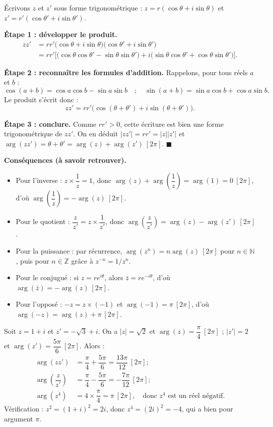 \documentclass[11pt]{article}
\begin{document}
\begin{experience}
Écrivons $z$ et $z'$ sous forme trigonométrique : $z = r(\cos\theta + i\sin\theta)$ et $z' = r'(\cos\theta' + i\sin\theta')$.

\textbf{Étape 1 : développer le produit.}
\begin{align*}
zz' &= rr'\big(\cos\theta + i\sin\theta\big)\big(\cos\theta' + i\sin\theta'\big) \\
&= rr'\Big[\big(\cos\theta\cos\theta' - \sin\theta\sin\theta'\big) + i\big(\sin\theta\cos\theta' + \cos\theta\sin\theta'\big)\Big].
\end{align*}

\textbf{Étape 2 : reconnaître les formules d'addition.} Rappelons, pour tous réels $a$ et $b$ :
\[ \cos(a+b) = \cos a\cos b - \sin a\sin b \quad ; \quad \sin(a+b) = \sin a\cos b + \cos a\sin b. \]
Le produit s'écrit donc :
\[ zz' = rr'\big(\cos(\theta+\theta') + i\sin(\theta+\theta')\big). \]

\textbf{Étape 3 : conclure.} Comme $rr' > 0$, cette écriture est bien une forme trigonométrique de $zz'$. On en déduit $|zz'| = rr' = |z||z'|$ et $\arg(zz') = \theta + \theta' = \arg(z) + \arg(z') \ [2\pi]$. $\blacksquare$

\textbf{Conséquences (à savoir retrouver).}
\begin{itemize}
\item Pour l'inverse : $z \times \dfrac{1}{z} = 1$, donc $\arg(z) + \arg\left(\dfrac{1}{z}\right) = \arg(1) = 0 \ [2\pi]$, d'où $\arg\left(\dfrac{1}{z}\right) = -\arg(z) \ [2\pi]$.
\item Pour le quotient : $\dfrac{z}{z'} = z \times \dfrac{1}{z'}$, donc $\arg\left(\dfrac{z}{z'}\right) = \arg(z) - \arg(z') \ [2\pi]$.
\item Pour la puissance : par récurrence, $\arg(z^n) = n\arg(z) \ [2\pi]$ pour $n \in \mathbb{N}$, puis pour $n \in \mathbb{Z}$ grâce à $z^{-n} = 1/z^n$.
\item Pour le conjugué : si $z = re^{i\theta}$, alors $\bar{z} = re^{-i\theta}$, d'où $\arg(\bar{z}) = -\arg(z) \ [2\pi]$.
\item Pour l'opposé : $-z = z \times (-1)$ et $\arg(-1) = \pi \ [2\pi]$, d'où $\arg(-z) = \arg(z) + \pi \ [2\pi]$.
\end{itemize}
\end{experience}

\begin{exemplebox}
Soit $z = 1 + i$ et $z' = -\sqrt{3} + i$. On a $|z| = \sqrt{2}$ et $\arg(z) = \dfrac{\pi}{4} \ [2\pi]$ ; $|z'| = 2$ et $\arg(z') = \dfrac{5\pi}{6} \ [2\pi]$. Alors :
\begin{align*}
\arg(zz') &= \dfrac{\pi}{4} + \dfrac{5\pi}{6} = \dfrac{13\pi}{12} \ [2\pi] ;\\
\arg\left(\dfrac{z}{z'}\right) &= \dfrac{\pi}{4} - \dfrac{5\pi}{6} = -\dfrac{7\pi}{12} \ [2\pi] ;\\
\arg(z^4) &= 4 \times \dfrac{\pi}{4} = \pi \ [2\pi], \quad \text{donc } z^4 \text{ est un réel négatif.}
\end{align*}
Vérification : $z^2 = (1+i)^2 = 2i$, donc $z^4 = (2i)^2 = -4$, qui a bien pour argument $\pi$.
\end{exemplebox}
\end{document}
